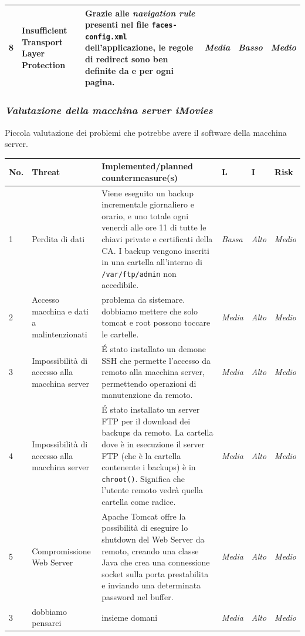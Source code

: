\documentclass{article}
\begin{document}
\begin{footnotesize}
\begin{longtable}{p{0.3cm}p{3cm}p{4.6cm}p{0.5cm}p{0.5cm}p{0.5cm}}
\hline
 8 & Insufficient Transport Layer Protection & Grazie alle \emph{navigation rule} presenti nel file {\tt faces-config.xml} dell'applicazione, le regole di redirect sono ben definite da e per ogni pagina.  & {\it Media} & {\it Basso} & {\it Medio} \\
\hline
\end{longtable}
\end{footnotesize}



\subsubsection{{\it Valutazione della macchina server iMovies}}
Piccola valutazione dei problemi che potrebbe avere il software della macchina server.\\ \noindent
\begin{footnotesize}
\begin{longtable}{p{0.3cm}p{2.3cm}p{5.5cm}p{0.5cm}p{0.5cm}p{0.5cm}}
No. & Threat & Implemented/planned countermeasure(s) & L & I & Risk \\
\hline
1 & Perdita di dati & Viene eseguito un backup incrementale giornaliero e orario, e uno totale ogni venerdi alle ore 11 di tutte le chiavi private e certificati della CA. I backup vengono inseriti in una cartella all'interno di { \tt /var/ftp/admin} non accedibile. & {\it Bassa} & {\it Alto} & {\it Medio} \\
\hline
2 & Accesso macchina e dati a malintenzionati & problema da sistemare. dobbiamo mettere che solo tomcat e root possono toccare le cartelle. & {\it Media} & {\it Alto} & {\it Medio} \\
\hline
3 & Impossibilità di accesso alla macchina server & \'E stato installato un demone SSH che permette l'accesso da remoto alla macchina server, permettendo operazioni di manutenzione da remoto. & {\it Media} & {\it Alto} & {\it Medio} \\
\hline
4 & Impossibilità di accesso alla macchina server & \'E stato installato un server FTP per il download dei backups da remoto. La cartella dove è in esecuzione il server FTP (che è la cartella contenente i backups) è in {\tt chroot()}. Significa che l'utente remoto vedrà quella cartella come radice. & {\it Media} & {\it Alto} & {\it Medio} \\
\hline
5 & Compromissione Web Server & Apache Tomcat offre la possibilità di eseguire lo shutdown del Web Server da remoto, creando una classe Java che crea una connessione socket sulla porta prestabilita e inviando una determinata password nel buffer. & {\it Media} & {\it Alto} & {\it Medio} \\
\hline
3 & dobbiamo pensarci & insieme domani & {\it Media} & {\it Alto} & {\it Medio} \\
\hline
\end{longtable}
\end{footnotesize}
\end{document}
